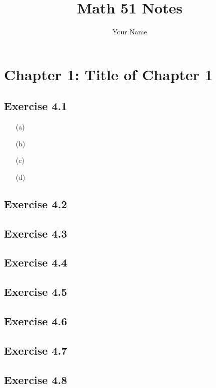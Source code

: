 \documentclass[11pt]{article}
\title{Math 51 Notes}
\author{Your Name}
\date{}
\theoremstyle{definition}
\theoremstyle{remark}
\begin{document}
\maketitle
\tableofcontents
\newpage

\section{Chapter 1: Title of Chapter 1}

\subsection{Exercise 4.1}

\begin{enumerate}
    \item[(a)] 
    \item[(b)] 
    \item[(c)] 
    \item[(d)] 
\end{enumerate}

\subsection{Exercise 4.2}

\subsection{Exercise 4.3}

\subsection{Exercise 4.4}

\subsection{Exercise 4.5}

\subsection{Exercise 4.6}

\subsection{Exercise 4.7}

\subsection{Exercise 4.8}

\end{document}
